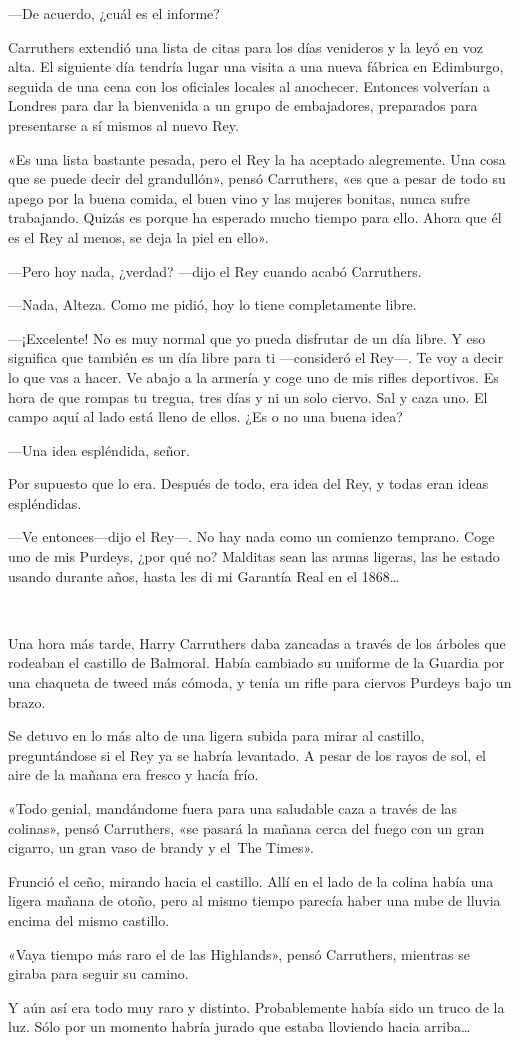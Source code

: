 ---De acuerdo, ¿cuál es el informe?

Carruthers extendió una lista de citas para los días venideros y la leyó
en voz alta. El siguiente día tendría lugar una visita a una nueva
fábrica en Edimburgo, seguida de una cena con los oficiales locales al
anochecer. Entonces volverían a Londres para dar la bienvenida a un
grupo de embajadores, preparados para presentarse a sí mismos al nuevo
Rey.

«Es una lista bastante pesada, pero el Rey la ha aceptado alegremente.
Una cosa que se puede decir del grandullón», pensó Carruthers, «es que a
pesar de todo su apego por la buena comida, el buen vino y las mujeres
bonitas, nunca sufre trabajando. Quizás es porque ha esperado mucho
tiempo para ello. Ahora que él es el Rey al menos, se deja la piel en
ello».

---Pero hoy nada, ¿verdad? ---dijo el Rey cuando acabó Carruthers.

---Nada, Alteza. Como me pidió, hoy lo tiene completamente libre.

---¡Excelente! No es muy normal que yo pueda disfrutar de un día libre.
Y eso significa que también es un día libre para ti ---consideró el
Rey---. Te voy a decir lo que vas a hacer. Ve abajo a la armería y coge
uno de mis rifles deportivos. Es hora de que rompas tu tregua, tres días
y ni un solo ciervo. Sal y caza uno. El campo aquí al lado está lleno de
ellos. ¿Es o no una buena idea?

---Una idea espléndida, señor.

Por supuesto que lo era. Después de todo, era idea del Rey, y todas eran
ideas espléndidas.

---Ve entonces---dijo el Rey---. No hay nada como un comienzo temprano.
Coge uno de mis Purdeys, ¿por qué no? Malditas sean las armas ligeras,
las he estado usando durante años, hasta les di mi Garantía Real en el
1868\ldots{}

~

Una hora más tarde, Harry Carruthers daba zancadas a través de los
árboles que rodeaban el castillo de Balmoral. Había cambiado su uniforme
de la Guardia por una chaqueta de tweed más cómoda, y tenía un rifle
para ciervos Purdeys bajo un brazo.

Se detuvo en lo más alto de una ligera subida para mirar al castillo,
preguntándose si el Rey ya se habría levantado. A pesar de los rayos de
sol, el aire de la mañana era fresco y hacía frío.

«Todo genial, mandándome fuera para una saludable caza a través de las
colinas», pensó Carruthers, «se pasará la mañana cerca del fuego con un
gran cigarro, un gran vaso de brandy y el~The Times».

Frunció el ceño, mirando hacia el castillo. Allí en el lado de la colina
había una ligera mañana de otoño, pero al mismo tiempo parecía haber una
nube de lluvia encima del mismo castillo.

«Vaya tiempo más raro el de las Highlands», pensó Carruthers, mientras
se giraba para seguir su camino.

Y aún así era todo muy raro y distinto. Probablemente había sido un
truco de la luz. Sólo por un momento habría jurado que estaba lloviendo
hacia arriba\ldots{}
